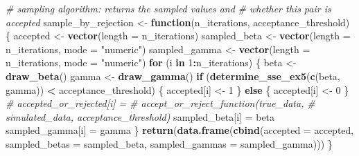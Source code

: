 \documentclass[
]{article}
\newenvironment{Shaded}{\begin{snugshade}}{\end{snugshade}}
\newcommand{\AttributeTok}[1]{\textcolor[rgb]{0.13,0.29,0.53}{#1}}
\newcommand{\CommentTok}[1]{\textcolor[rgb]{0.56,0.35,0.01}{\textit{#1}}}
\newcommand{\ControlFlowTok}[1]{\textcolor[rgb]{0.13,0.29,0.53}{\textbf{#1}}}
\newcommand{\DecValTok}[1]{\textcolor[rgb]{0.00,0.00,0.81}{#1}}
\newcommand{\FunctionTok}[1]{\textcolor[rgb]{0.13,0.29,0.53}{\textbf{#1}}}
\newcommand{\NormalTok}[1]{#1}
\newcommand{\OtherTok}[1]{\textcolor[rgb]{0.56,0.35,0.01}{#1}}
\newcommand{\SpecialCharTok}[1]{\textcolor[rgb]{0.81,0.36,0.00}{\textbf{#1}}}
\newcommand{\StringTok}[1]{\textcolor[rgb]{0.31,0.60,0.02}{#1}}
\begin{document}
\begin{Shaded}
\begin{Highlighting}[]
\CommentTok{\# sampling algorithm: returns the sampled values and}
\CommentTok{\# whether this pair is accepted}
\NormalTok{sample\_by\_rejection }\OtherTok{\textless{}{-}} \ControlFlowTok{function}\NormalTok{(n\_iterations, acceptance\_threshold) \{}
\NormalTok{    accepted }\OtherTok{\textless{}{-}} \FunctionTok{vector}\NormalTok{(}\AttributeTok{length =}\NormalTok{ n\_iterations)}
\NormalTok{    sampled\_beta }\OtherTok{\textless{}{-}} \FunctionTok{vector}\NormalTok{(}\AttributeTok{length =}\NormalTok{ n\_iterations, }\AttributeTok{mode =} \StringTok{"numeric"}\NormalTok{)}
\NormalTok{    sampled\_gamma }\OtherTok{\textless{}{-}} \FunctionTok{vector}\NormalTok{(}\AttributeTok{length =}\NormalTok{ n\_iterations, }\AttributeTok{mode =} \StringTok{"numeric"}\NormalTok{)}
    \ControlFlowTok{for}\NormalTok{ (i }\ControlFlowTok{in} \DecValTok{1}\SpecialCharTok{:}\NormalTok{n\_iterations) \{}
\NormalTok{        beta }\OtherTok{\textless{}{-}} \FunctionTok{draw\_beta}\NormalTok{()}
\NormalTok{        gamma }\OtherTok{\textless{}{-}} \FunctionTok{draw\_gamma}\NormalTok{()}
        \ControlFlowTok{if}\NormalTok{ (}\FunctionTok{determine\_sse\_ex5}\NormalTok{(}\FunctionTok{c}\NormalTok{(beta, gamma)) }\SpecialCharTok{\textless{}}\NormalTok{ acceptance\_threshold) \{}
\NormalTok{            accepted[i] }\OtherTok{\textless{}{-}} \DecValTok{1}
\NormalTok{        \} }\ControlFlowTok{else}\NormalTok{ \{}
\NormalTok{            accepted[i] }\OtherTok{\textless{}{-}} \DecValTok{0}
\NormalTok{        \}}
        \CommentTok{\# accepted\_or\_rejected[i] =}
        \CommentTok{\# accept\_or\_reject\_function(true\_data,}
        \CommentTok{\# simulated\_data, acceptance\_threshold)}
\NormalTok{        sampled\_beta[i] }\OtherTok{=}\NormalTok{ beta}
\NormalTok{        sampled\_gamma[i] }\OtherTok{=}\NormalTok{ gamma}
\NormalTok{    \}}
    \FunctionTok{return}\NormalTok{(}\FunctionTok{data.frame}\NormalTok{(}\FunctionTok{cbind}\NormalTok{(}\AttributeTok{accepted =}\NormalTok{ accepted, }\AttributeTok{sampled\_betas =}\NormalTok{ sampled\_beta,}
        \AttributeTok{sampled\_gammas =}\NormalTok{ sampled\_gamma)))}
\NormalTok{\}}
\end{Highlighting}
\end{Shaded}
\end{document}
